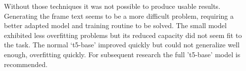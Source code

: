 \documentclass[11pt,a4paper,onecolumn,oneside,notitlepage]{article}
\begin{document}
Without those techniques it was not possible to produce usable results. Generating the frame text seems to be a more difficult problem, requiring a better adapted model and training routine to be solved. The small model exhibited less overfitting problems but its reduced capacity did not seem fit to the task. The normal ‘t5-base’ improved quickly but could not generalize well enough, overfitting quickly. For subsequent research the full 't5-base' model is recommended.



\printbibliography
\end{document}
